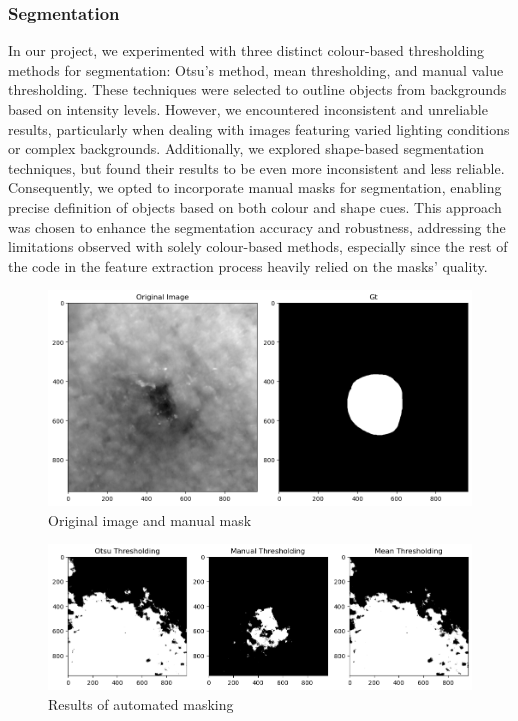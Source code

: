 \subsubsection{Segmentation}
In our project, we experimented with three distinct colour-based thresholding methods for segmentation: Otsu's method, mean thresholding, and manual value thresholding. These techniques were selected to outline objects from backgrounds based on intensity levels. However, we encountered inconsistent and unreliable results, particularly when dealing with images featuring varied lighting conditions or complex backgrounds. Additionally, we explored shape-based segmentation techniques, but found their results to be even more inconsistent and less reliable. Consequently, we opted to incorporate manual masks for segmentation, enabling precise definition of objects based on both colour and shape cues. This approach was chosen to enhance the segmentation accuracy and robustness, addressing the limitations observed with solely colour-based methods, especially since the rest of the code in the feature extraction process heavily relied on the masks' quality.

\begin{figure}[H]
    \centering
    \includegraphics[width=1\linewidth]{original_gt.png}
    \caption{Original image and manual mask}
    \label{fig:enter-label}
\end{figure}
\begin{figure}[H]
    \centering
    \includegraphics[width=1\linewidth]{result_segmentation.png}
    \caption{Results of automated masking}
    \label{fig:enter-label}
\end{figure}